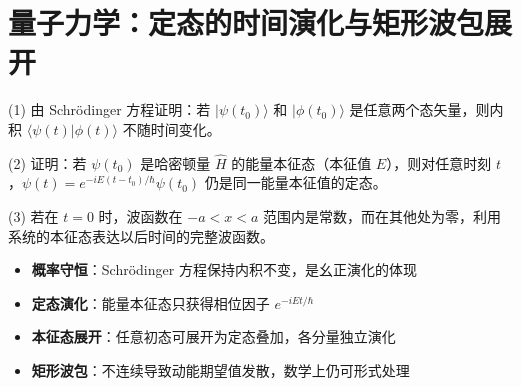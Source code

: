 \section{量子力学：定态的时间演化与矩形波包展开}
\label{sec:stationary-state-evolution}

\begin{modelbox}[题目：定态的时间演化与初始波包展开]
(1) 由 Schrödinger 方程证明：若 $|\psi(t_0)\rangle$ 和 $|\phi(t_0)\rangle$ 是任意两个态矢量，则内积 $\langle\psi(t)|\phi(t)\rangle$ 不随时间变化。

(2) 证明：若 $\psi(t_0)$ 是哈密顿量 $\hat H$ 的能量本征态（本征值 $E$），则对任意时刻 $t$，$\psi(t)=e^{-iE(t-t_0)/\hbar}\psi(t_0)$ 仍是同一能量本征值的定态。

(3) 若在 $t=0$ 时，波函数在 $-a<x<a$ 范围内是常数，而在其他处为零，利用系统的本征态表达以后时间的完整波函数。
\end{modelbox}

\begin{tipbox}[考点快速分析]
\begin{itemize}
    \item \textbf{概率守恒}：Schrödinger 方程保持内积不变，是幺正演化的体现
    \item \textbf{定态演化}：能量本征态只获得相位因子 $e^{-iEt/\hbar}$
    \item \textbf{本征态展开}：任意初态可展开为定态叠加，各分量独立演化
    \item \textbf{矩形波包}：不连续导致动能期望值发散，数学上仍可形式处理
\end{itemize}
\end{tipbox}

